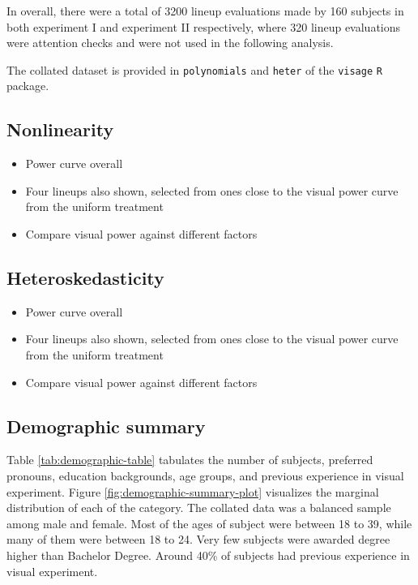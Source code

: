 \documentclass[]{interact}
\theoremstyle{plain}%
\theoremstyle{definition}
\theoremstyle{remark}
\def\tightlist{}
\begin{document}
In overall, there were a total of 3200 lineup evaluations made by 160
subjects in both experiment I and experiment II respectively, where 320
lineup evaluations were attention checks and were not used in the
following analysis.

The collated dataset is provided in \texttt{polynomials} and
\texttt{heter} of the \texttt{visage} \texttt{R} package.

\hypertarget{section}{%
\subsection{}\label{section}}

\hypertarget{nonlinearity-1}{%
\subsection{Nonlinearity}\label{nonlinearity-1}}

\begin{itemize}
\tightlist
\item
  Power curve overall
\item
  Four lineups also shown, selected from ones close to the visual power
  curve from the uniform treatment
\item
  Compare visual power against different factors
\end{itemize}

\hypertarget{heteroskedasticity-2}{%
\subsection{Heteroskedasticity}\label{heteroskedasticity-2}}

\begin{itemize}
\tightlist
\item
  Power curve overall
\item
  Four lineups also shown, selected from ones close to the visual power
  curve from the uniform treatment
\item
  Compare visual power against different factors
\end{itemize}

\hypertarget{demographic-summary}{%
\subsection{Demographic summary}\label{demographic-summary}}

Table \ref{tab:demographic-table} tabulates the number of subjects,
preferred pronouns, education backgrounds, age groups, and previous
experience in visual experiment. Figure
\ref{fig:demographic-summary-plot} visualizes the marginal distribution
of each of the category. The collated data was a balanced sample among
male and female. Most of the ages of subject were between 18 to 39,
while many of them were between 18 to 24. Very few subjects were awarded
degree higher than Bachelor Degree. Around 40\% of subjects had previous
experience in visual experiment.
\end{document}
